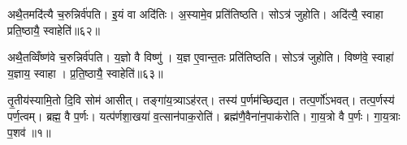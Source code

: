 अथै॒तमदि॑त्यै च॒रुन्निर्व॑पति। इ॒यं वा अदि॑तिः। अ॒स्यामे॒व प्रति॑तिष्ठति। सोऽत्र॑ जुहोति। अदि॑त्यै॒ स्वाहा प्रति॒ष्ठायै॒ स्वाहेति॑॥६२॥

अथै॒तव्विँष्ण॑वे च॒रुन्निर्व॑पति। य॒ज्ञो वै विष्णु॑। य॒ज्ञ ए॒वान्त॒तः प्रति॑तिष्ठति। सोऽत्र॑ जुहोति। विष्ण॑वे॒ स्वाहा॑ य॒ज्ञाय॒ स्वाहा। प्र॒ति॒ष्ठायै॒ स्वाहेति॑॥६३॥



\clearpage
{}
\setcounter{anuvakam}{0}
तृ॒तीय॑स्यामि॒तो दि॒वि सोम॑ आसीत्। तङ्गा॑य॒त्र्याऽह॑रत्। तस्य॑ प॒र्णम॑च्छिद्यत। तत्प॒र्णो॑ऽभवत्। तत्प॒र्णस्य॑ पर्ण॒त्वम्। ब्रह्म॒ वै प॒र्णः। यत्प॑र्णशा॒खया॑ व॒त्सान॑पाक॒रोति॑। ब्रह्म॑णै॒वैना॑न॒पाक॑रोति। गा॒य॒त्रो वै प॒र्णः। गा॒य॒त्राः प॒शव॑॥१॥

